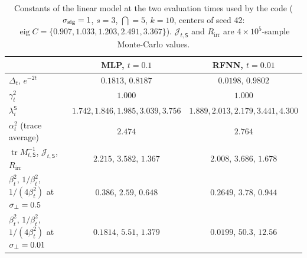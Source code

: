 \begin{table}[h]
\centering\small
\caption{Constants of the linear model at the two evaluation times used by the code ($\sigma_{\mathrm{sig}}=1$, $s=3$, $\dint=5$, $k=10$, centers of seed 42: $\operatorname{eig}C=\{0.907,1.033,1.203,2.491,3.367\}$). $\mathcal J_{t,\mathsf S}$ and $R_{\mathrm{irr}}$ are $4\times10^5$-sample Monte-Carlo values.}\label{tab:lin-constants}
\begin{tabular}{lcc}
\toprule
 & MLP, $t=0.1$ & RFNN, $t=0.01$\\
\midrule
$\Delta_t$, $e^{-2t}$ & $0.1813$, $0.8187$ & $0.0198$, $0.9802$\\
$\gamma_t^2$ & $1.000$ & $1.000$\\
$\lambda^{\mathsf S}_i$ & $1.742,1.846,1.985,3.039,3.756$ & $1.889,2.013,2.179,3.441,4.300$\\
$\alpha_t^2$ (trace average) & $2.474$ & $2.764$\\
$\operatorname{tr}M_{t,\mathsf S}^{-1}$, $\mathcal J_{t,\mathsf S}$, $R_{\mathrm{irr}}$ & $2.215$, $3.582$, $1.367$ & $2.008$, $3.686$, $1.678$\\
$\beta_t^2$, $1/\beta_t^2$, $1/(4\beta_t^2)$ at $\sigma_{\perp}=0.5$ & $0.386$, $2.59$, $0.648$ & $0.2649$, $3.78$, $0.944$\\
$\beta_t^2$, $1/\beta_t^2$, $1/(4\beta_t^2)$ at $\sigma_{\perp}=0.01$ & $0.1814$, $5.51$, $1.379$ & $0.0199$, $50.3$, $12.56$\\
\bottomrule
\end{tabular}
\end{table}

